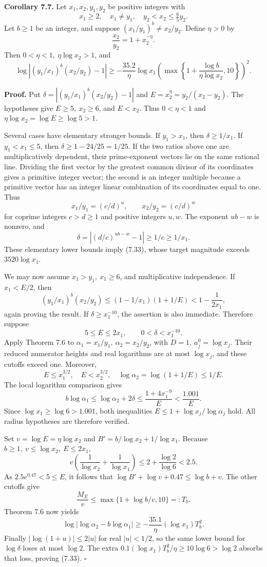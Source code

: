 \documentclass[
  11pt,
  a4paper,
]{article}
\begin{document}
\textbf{Corollary 7.7.} Let \(x_1,x_2,y_1,y_2\) be positive integers
with \[
x_1\ge2,\quad x_1\ne y_1,\quad
y_2<x_2\le\tfrac65y_2.
\] Let \(b\ge1\) be an integer, and suppose \((x_1/y_1)^b\ne x_2/y_2\).
Define \(\eta>0\) by \[
\frac{x_2}{y_2}=1+x_2^{-\eta}.
\] Then \(0<\eta<1,\ \eta\log x_2>1\), and \[
\log\left|(y_1/x_1)^b(x_2/y_2)-1\right|
\ge-\frac{35.2}{\eta}\log x_1
\left(\max\left\{1+\frac{\log b}{\eta\log x_2},10\right\}\right)^2.
\tag{7.33}
\]

\textbf{Proof.} Put \(\delta=|(y_1/x_1)^b(x_2/y_2)-1|\) and
\(E=x_2^\eta=y_2/(x_2-y_2)\). The hypotheses give \(E\ge5,\ x_2\ge6\),
and \(E<x_2\). Thus \(0<\eta<1\) and \(\eta\log x_2=\log E\ge\log5>1\).

Several cases have elementary stronger bounds. If \(y_1>x_1\), then
\(\delta\ge1/x_1\). If \(y_1<x_1\le5\), then \(\delta\ge1-24/25=1/25\).
If the two ratios above one are multiplicatively dependent, their
prime-exponent vectors lie on the same rational line. Dividing the first
vector by the greatest common divisor of its coordinates gives a
primitive integer vector; the second is an integer multiple because a
primitive vector has an integer linear combination of its coordinates
equal to one. Thus \[
x_1/y_1=(c/d)^u,\qquad x_2/y_2=(c/d)^w
\] for coprime integers \(c>d\ge1\) and positive integers \(u,w\). The
exponent \(ub-w\) is nonzero, and \[
\delta=|(d/c)^{ub-w}-1|\ge1/c\ge1/x_1.
\] These elementary lower bounds imply (7.33), whose target magnitude
exceeds \(3520\log x_1\).

We may now assume \(x_1>y_1,\ x_1\ge6\), and multiplicative
independence. If \(x_1<E/2\), then \[
(y_1/x_1)^b(x_2/y_2)
\le(1-1/x_1)(1+1/E)<1-\frac1{2x_1},
\] again proving the result. If \(\delta\ge x_1^{-10}\), the assertion
is also immediate. Therefore suppose \[
5\le E\le2x_1,\qquad 0<\delta<x_1^{-10}.
\] Apply Theorem 7.6 to \(\alpha_1=x_1/y_1,\ \alpha_2=x_2/y_2\), with
\(D=1,\ a_j^0=\log x_j\). Their reduced numerator heights and real
logarithms are at most \(\log x_j\), and these cutoffs exceed one.
Moreover, \[
E\le x_1^{3/2},\quad E<x_2^{3/2},\quad
\log\alpha_2=\log(1+1/E)\le1/E.
\] The local logarithm comparison gives \[
b\log\alpha_1\le\log\alpha_2+2\delta
\le\frac{1+4x_1^{-9}}{E}<\frac{1.001}{E}.
\] Since \(\log x_1\ge\log6>1.001\), both inequalities
\(E\le1+\log x_j/\log\alpha_j\) hold. All radius hypotheses are
therefore verified.

Set \(v=\log E=\eta\log x_2\) and \(B'=b/\log x_2+1/\log x_1\). Because
\(b\ge1,\ v\le\log x_2,\ E\le2x_1\), \[
v\left(\frac1{\log x_2}+\frac1{\log x_1}\right)
\le2+\frac{\log2}{\log6}<2.5.
\] As \(2.5e^{0.47}<5\le E\), it follows that
\(\log B'+\log v+0.47\le\log b+v\). The other cutoffs give \[
\frac{M_E}{v}\le
\max\{1+\log b/v,10\}=:T_b.
\] Theorem 7.6 now yields \[
\log|\log\alpha_2-b\log\alpha_1|
\ge-\frac{35.1}{\eta}(\log x_1)T_b^2.
\] Finally \(|\log(1+u)|\le2|u|\) for real \(|u|<1/2\), so the same
lower bound for \(\log\delta\) loses at most \(\log2\). The extra
\(0.1(\log x_1)T_b^2/\eta\ge10\log6>\log2\) absorbs that loss, proving
(7.33). \(\square\)
\end{document}
